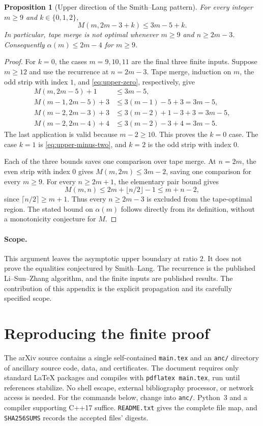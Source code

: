 \documentclass[11pt]{article}
\newtheorem{proposition}[theorem]{Proposition}
\theoremstyle{definition}
\theoremstyle{remark}
\begin{document}
\begin{proposition}[Upper direction of the Smith--Lang pattern]
\label{prop:upper-smith-lang}
For every integer $m\ge9$ and $k\in\{0,1,2\}$,
\begin{equation}\label{eq:upper-smith-lang}
 M(m,2m-3+k)\le3m-5+k.
\end{equation}
In particular, tape merge is not optimal whenever $m\ge9$ and $n\ge2m-3$.
Consequently $\alpha(m)\le2m-4$ for $m\ge9$.
\end{proposition}
\begin{proof}
For $k=0$, the cases $m=9,10,11$ are the final three finite inputs.
Suppose $m\ge12$ and use the recurrence at $n=2m-3$.
Tape merge, induction on $m$, the odd strip with index $1$, and
\eqref{eq:upper-zero}, respectively, give
\[
\begin{split}
 M(m,2m-5)+1&\le3m-5,\\
 M(m-1,2m-5)+3&\le3(m-1)-5+3=3m-5,\\
 M(m-2,2m-3)+3&\le3(m-2)+1-3+3=3m-5,\\
 M(m-2,2m-4)+4&\le3(m-2)-3+4=3m-5.
\end{split}
\]
The last application is valid because $m-2\ge10$.
This proves the $k=0$ case.  The case $k=1$ is
\eqref{eq:upper-minus-two}, and $k=2$ is the odd strip with index $0$.

Each of the three bounds saves one comparison over tape merge.
At $n=2m$, the even strip with index $0$ gives
$M(m,2m)\le3m-2$, saving one comparison for every $m\ge9$.
For every $n\ge2m+1$, the elementary pair bound gives
\[
 M(m,n)\le2m+\lfloor n/2\rfloor-1\le m+n-2,
\]
since $\lceil n/2\rceil\ge m+1$.  Thus every $n\ge2m-3$ is excluded
from the tape-optimal region.  The stated bound on $\alpha(m)$ follows
directly from its definition, without a monotonicity conjecture for $M$.
\end{proof}

\paragraph{Scope.}
This argument leaves the asymptotic upper boundary at ratio $2$.
It does not prove the equalities conjectured by Smith--Lang.
The recurrence is the published Li--Sun--Zhang algorithm, and the finite
inputs are published results.  The contribution of this appendix is the
explicit propagation and its carefully specified scope.


\section{Reproducing the finite proof}
\label{app:reproduction}
The arXiv source contains a single self-contained \texttt{main.tex} and an
\texttt{anc/} directory of ancillary source code, data, and certificates.
The document requires only standard \LaTeX{} packages and compiles with
\texttt{pdflatex main.tex}, run until references stabilize. No shell escape,
external bibliography processor, or network access is needed.
For the commands below, change into \texttt{anc/}. Python~3 and a compiler
supporting C++17 suffice. \texttt{README.txt} gives the complete file map,
and \texttt{SHA256SUMS} records the accepted files' digests.
\end{document}
